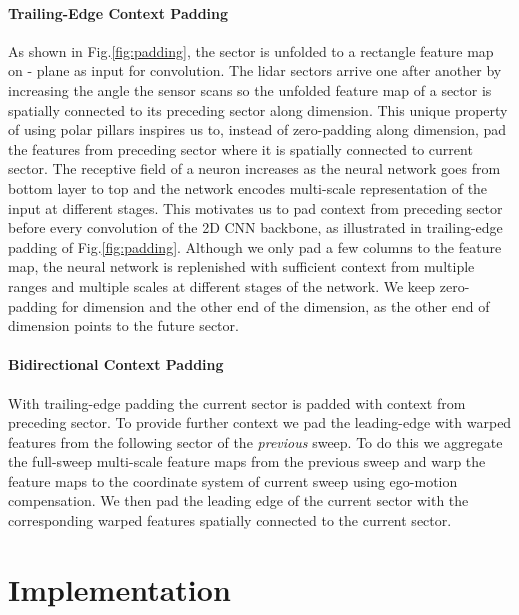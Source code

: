 \documentclass{article}
\begin{document}
\vspace{-2mm}\paragraph{Trailing-Edge Context Padding}As shown in Fig.\ref{fig:padding}, the sector is unfolded to a rectangle feature map on - plane as input for convolution. The lidar sectors arrive one after another by increasing the angle the sensor scans so the unfolded feature map of a sector is spatially connected to its preceding sector along  dimension. This unique property of using polar pillars inspires us to, instead of zero-padding along  dimension, pad the features from preceding sector where it is spatially connected to current sector. The receptive field of a neuron increases as the neural network goes from bottom layer to top and the network encodes multi-scale representation of the input at different stages. This motivates us to pad context from preceding sector before every convolution of the 2D CNN backbone, as illustrated in trailing-edge padding of Fig.\ref{fig:padding}. Although we only pad a few columns to the feature map, the neural network is replenished with sufficient context from multiple ranges and multiple scales at different stages of the network. We keep zero-padding for  dimension and the other end of the  dimension, as the other end of  dimension points to the future sector.



\vspace{-3mm}\paragraph{Bidirectional Context Padding} With trailing-edge padding the current sector is padded with context from preceding sector. To provide further context we pad the leading-edge with warped features from the following sector of the \emph{previous} sweep. To do this we aggregate the full-sweep multi-scale feature maps from the previous sweep and warp the feature maps to the coordinate system of current sweep using ego-motion compensation. We then pad the leading edge of the current sector with the corresponding warped features spatially connected to the current sector.
\vspace{-3mm}

\section{Implementation}\label{implement}\vspace{-2mm}
\end{document}
